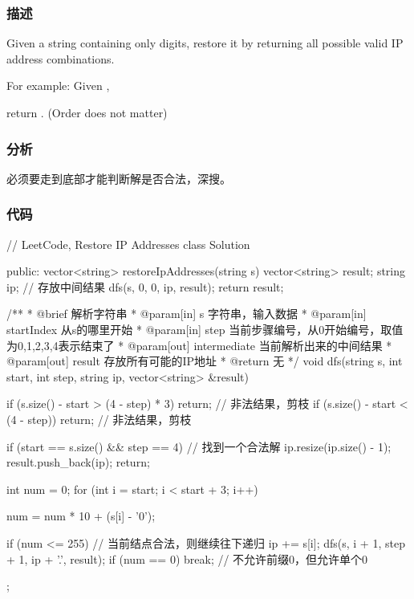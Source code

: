 \subsubsection{描述}
Given a string containing only digits, restore it by returning all possible valid IP address combinations.

For example:
Given ,

return \code{["255.255.11.135", "255.255.111.35"]}. (Order does not matter)


\subsubsection{分析}
必须要走到底部才能判断解是否合法，深搜。


\subsubsection{代码}
\begin{Code}
// LeetCode, Restore IP Addresses
class Solution {
public:
    vector<string> restoreIpAddresses(string s) {
        vector<string> result;
        string ip; // 存放中间结果
        dfs(s, 0, 0, ip, result);
        return result;
    }

    /**
     * @brief 解析字符串
     * @param[in] s 字符串，输入数据
     * @param[in] startIndex 从s的哪里开始
     * @param[in] step 当前步骤编号，从0开始编号，取值为0,1,2,3,4表示结束了
     * @param[out] intermediate 当前解析出来的中间结果
     * @param[out] result 存放所有可能的IP地址
     * @return 无
     */
    void dfs(string s, int start, int step, string ip,
            vector<string> &result) {
        if (s.size() - start > (4 - step) * 3)
            return;  // 非法结果，剪枝
        if (s.size() - start < (4 - step))
            return;  // 非法结果，剪枝

        if (start == s.size() && step == 4) {  // 找到一个合法解
            ip.resize(ip.size() - 1);
            result.push_back(ip);
            return;
        }

        int num = 0;
        for (int i = start; i < start + 3; i++) {
            num = num * 10 + (s[i] - '0');

            if (num <= 255) {  // 当前结点合法，则继续往下递归
                ip += s[i];
                dfs(s, i + 1, step + 1, ip + '.', result);
            }
            if (num == 0) break;  // 不允许前缀0，但允许单个0
        }
    }
};
\end{Code}


